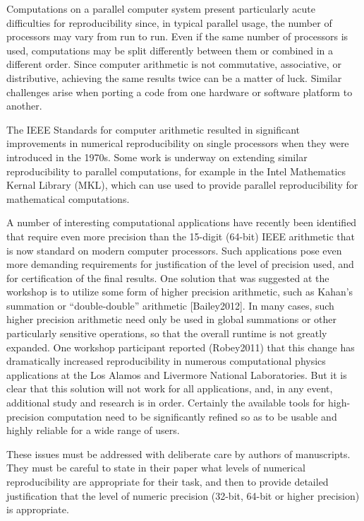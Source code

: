 \documentclass[11pt]{article}
\begin{document}
Computations on a parallel computer system present particularly acute
difficulties for reproducibility since, in typical parallel usage, the
number of processors may vary from run to run.  Even if the same number of
processors is used, computations may be split differently between them or
combined in a different order.  Since computer arithmetic is not
commutative, associative, or distributive, achieving the same results
twice can be a matter of luck.  Similar challenges arise when porting
a code from one hardware or software platform to another.

The IEEE Standards for computer arithmetic resulted in significant
improvements in numerical reproducibility on single processors when they were
introduced in the 1970s.  Some work is underway on extending similar
reproducibility to parallel computations, for example in the Intel
Mathematics Kernal Library (MKL), which can use used to provide parallel
reproducibility for mathematical computations.

A number of interesting computational applications have recently been
identified that require even more precision than the 15-digit (64-bit) IEEE
arithmetic that is now standard on modern computer processors.  Such
applications pose even more demanding requirements for justification of the
level of precision used, and for certification of the final results.  One
solution that was suggested at the workshop is to utilize some form of
higher precision arithmetic, such as Kahan’s summation or “double-double”
arithmetic [Bailey2012].  In many cases, such higher precision arithmetic
need only be used in global summations or other particularly sensitive
operations, so that the overall runtime is not greatly expanded.  One
workshop participant reported (Robey2011) that this change has dramatically
increased reproducibility in numerous computational physics applications at
the Los Alamos and Livermore National Laboratories.  
But it is clear that this solution will not work for all applications, and,
in any event, additional study and research is in order.  Certainly the
available tools for high-precision computation need to be significantly
refined so as to be usable and highly reliable for a wide range of users.

These issues must be addressed with deliberate care by authors of
manuscripts.  They must be careful to state in their paper what levels of
numerical reproducibility are appropriate for their task, and then to
provide detailed justification that the level of numeric precision (32-bit,
64-bit or higher precision) is appropriate.
\end{document}
